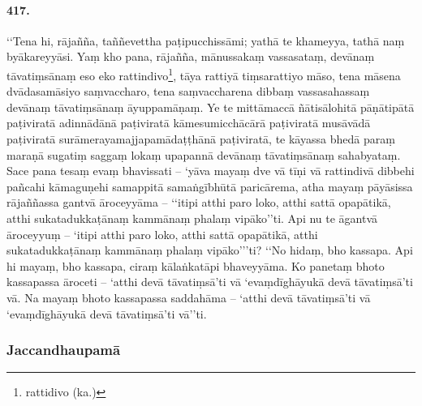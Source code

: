 \paragraph{417.} ‘‘Tena hi, rājañña, taññevettha paṭipucchissāmi; yathā te khameyya, tathā naṃ byākareyyāsi. Yaṃ kho pana, rājañña, mānussakaṃ vassasataṃ, devānaṃ tāvatiṃsānaṃ eso eko rattindivo\footnote{rattidivo (ka.)}, tāya rattiyā tiṃsarattiyo māso, tena māsena dvādasamāsiyo saṃvaccharo, tena saṃvaccharena dibbaṃ vassasahassaṃ devānaṃ tāvatiṃsānaṃ āyuppamāṇaṃ. Ye te mittāmaccā ñātisālohitā pāṇātipātā paṭiviratā adinnādānā paṭiviratā kāmesumicchācārā paṭiviratā musāvādā paṭiviratā surāmerayamajjapamādaṭṭhānā paṭiviratā, te kāyassa bhedā paraṃ maraṇā sugatiṃ saggaṃ lokaṃ upapannā devānaṃ tāvatiṃsānaṃ sahabyataṃ. Sace pana tesaṃ evaṃ bhavissati – ‘yāva mayaṃ dve vā tīṇi vā rattindivā dibbehi pañcahi kāmaguṇehi samappitā samaṅgībhūtā paricārema, atha mayaṃ pāyāsissa rājaññassa gantvā āroceyyāma – ‘‘itipi atthi paro loko, atthi sattā opapātikā, atthi sukatadukkaṭānaṃ kammānaṃ phalaṃ vipāko’’ti. Api nu te āgantvā āroceyyuṃ – ‘itipi atthi paro loko, atthi sattā opapātikā, atthi sukatadukkaṭānaṃ kammānaṃ phalaṃ vipāko’’’ti? ‘‘No hidaṃ, bho kassapa. Api hi mayaṃ, bho kassapa, ciraṃ kālaṅkatāpi bhaveyyāma. Ko panetaṃ bhoto kassapassa āroceti – ‘atthi devā tāvatiṃsā’ti vā ‘evaṃdīghāyukā devā tāvatiṃsā’ti vā. Na mayaṃ bhoto kassapassa saddahāma – ‘atthi devā tāvatiṃsā’ti vā ‘evaṃdīghāyukā devā tāvatiṃsā’ti vā’’ti.

\subsubsection{Jaccandhaupamā}

